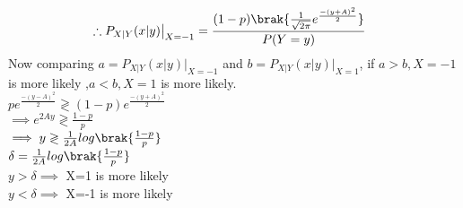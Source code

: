 \documentclass[journal,12pt,twocolumn]{IEEEtran}
\begin{document}
\begin{enumerate}[label=\thesection.\arabic*
,ref=\thesection.\theenumi]
\begin{align}
&\therefore P_{X|Y}(x|y) \big|_{X=-1}=\frac{(1-p)\brak{\frac{1}{\sqrt{2\pi}} e^{\frac{-(y+A)^2}{2}}}}{P(Y=y)}
\end{align}
Now comparing $a=P_{X|Y}(x|y) \big|_{X=-1}$ and $b=P_{X|Y}(x|y) \big|_{X=1}$, if $a>b, X=-1$ is more likely ,$a<b, X=1$ is more likely.\\
$p e^{\frac{-(y-A)^2}{2}}\gtrless(1-p)e^{\frac{-(y+A)^2}{2}}$\\
$\implies e^{2Ay}\gtrless\frac{1-p}{p}$\\
$\implies y\gtrless\frac{1}{2A}log\brak{\frac{1-p}{p}}$\\
$\delta=\frac{1}{2A}log\brak{\frac{1-p}{p}}$\\
$y>\delta \implies$ X=1 is more likely\\
$y<\delta \implies$ X=-1 is more likely
		\end{enumerate}
\end{document}
